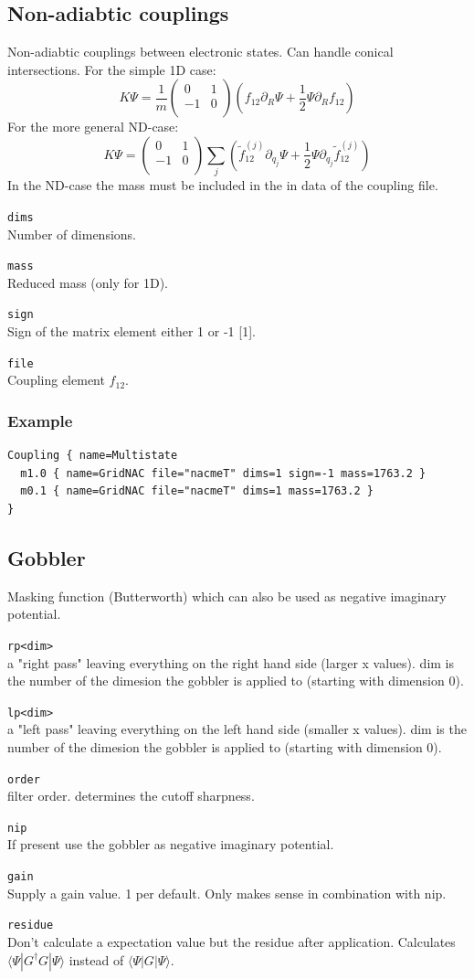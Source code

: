 \documentclass[a4paper,12pt]{scrbook}
\newcommand{\option}[2]{\item \texttt{#1}\\ #2}
\begin{document}
\subsection{Non-adiabtic couplings}
Non-adiabtic couplings between electronic states. Can handle conical intersections.
For the simple 1D case:
\begin{equation}
 K \Psi = \frac{1}{m}
\begin{pmatrix}
 0 & 1 \\
-1 & 0 \\
\end{pmatrix}
\left (
f_{12} \partial_R \Psi + \dfrac{1}{2} \Psi \partial_R f_{12}
\right )
\end{equation}
For the more general ND-case:
\begin{equation}
 K \Psi =
\begin{pmatrix}
 0 & 1 \\
-1 & 0 \\
\end{pmatrix}
\sum_j \left (
\tilde f_{12}^{(j)} \partial_{q_j} \Psi + \dfrac{1}{2} \Psi \partial_{q_j} \tilde f_{12}^{(j)}
\right )
\end{equation}
In the ND-case the mass must be included in the in data of the coupling file.

\begin{options}
 \option{dims}{Number of dimensions.}
 \option{mass}{Reduced mass (only for 1D).}
 \option{sign}{Sign of the matrix element either 1 or -1 [1].}
 \option{file}{Coupling element $f_{12}$.}
\end{options}

\subsubsection*{Example}
\begin{verbatim}
Coupling { name=Multistate
  m1.0 { name=GridNAC file="nacmeT" dims=1 sign=-1 mass=1763.2 }
  m0.1 { name=GridNAC file="nacmeT" dims=1 mass=1763.2 }
}
\end{verbatim}


\subsection{Gobbler}
Masking function (Butterworth) which can also be used as negative imaginary potential.

\begin{options}
\option{rp<dim>}{a "right pass" leaving everything on the right hand side (larger x values). dim is the number of the dimesion the gobbler is applied to (starting with dimension 0).}
\option{lp<dim>}{a "left pass" leaving everything on the left hand side (smaller x values). dim is the number of the dimesion the gobbler is applied to (starting with dimension 0).}
\option{order}{filter order. determines the cutoff sharpness.}
\option{nip}{If present use the gobbler as negative imaginary potential.}
\option{gain}{Supply a gain value. 1 per default. Only makes sense in combination with nip.}
\option{residue}{Don't calculate a expectation value but the residue after application. Calculates $\langle \Psi|G^\dagger G|\Psi\rangle$ instead of $\langle \Psi|G|\Psi\rangle$.}
\end{options}
\end{document}
